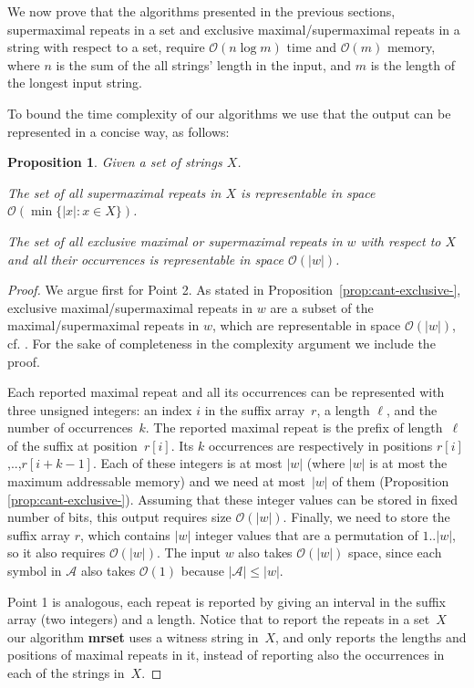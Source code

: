 \documentclass[submission]{dmtcs}
\newcommand{\Ode}{{\mathcal O}}
\newcommand\+[1]{\mathcal{#1}}
\newtheorem{proposition}[theorem]{Proposition}
\newenvironment{my_enumerate}{\begin{enumerate}
  \setlength{\itemsep}{1pt}
  \setlength{\parskip}{0pt}
  \setlength{\parsep}{0pt}}{\end{enumerate}}
\begin{document}
We now prove that the algorithms presented in the previous sections,
supermaximal repeats in a set and exclusive maximal/supermaximal repeats in a
string with respect to a set, require $\Ode(n \log m)$ time and $\Ode(m)$
memory, where $n$ is the sum of the all strings' length in the input, 
and $m$ is the length of the longest input string. 

To bound the time complexity of our algorithms
we use that the output can be represented in a concise way, as follows:

\begin{proposition}
Given a set of strings $X$.
\begin{my_enumerate}
\item The set of all supermaximal repeats in $X$ 
is representable in space $\Ode(\min\{|x|: x\in X\})$.

\item  The set of all exclusive maximal or supermaximal repeats in $w$ 
with respect to $X$  and all their occurrences
is representable in space $\Ode(|w|)$.
\end{my_enumerate}
\end{proposition}
\begin{proof}
We argue first for Point 2. 
As stated in Proposition~\ref{prop:cant-exclusive-}, 
exclusive maximal/supermaximal repeats in $w$ are a subset of the 
maximal/supermaximal repeats in $w$, which are representable
in space $\Ode(|w|)$, cf. \cite{findmaxr}.
For the sake of completeness in the complexity argument we include the 
proof.

Each reported maximal repeat and all its occurrences
can be represented with three unsigned integers:
an index $i$ in the suffix array~$r$,
a length $\ell$, and the number of occurrences~$k$.
The reported maximal repeat is the prefix of length~$\ell$
of the suffix at position~$r[i]$.
Its $k$ occurrences are respectively
in positions $r[i]$,..,$r[i+k-1]$.
Each of these integers is at most $|w|$
(where $|w|$ is at most the maximum addressable memory)
and we need at most~$|w|$ of them (Proposition \ref{prop:cant-exclusive-}).
Assuming that these integer values
can be stored in fixed number of bits,
this output requires size $\Ode(|w|)$.
Finally, we need to store the suffix array $r$,
which contains $|w|$ integer values that are
a permutation of $1..|w|$,
so it also requires $\Ode(|w|)$.
The input $w$ also takes $\Ode(|w|)$ space, since each symbol in $\+A$
also takes $\Ode(1)$ because $|\+A| \le |w|$.

Point 1 is analogous, each repeat is reported by giving an interval in the
suffix array (two integers) and a length.
Notice that to report the repeats in a set~$X$
our algorithm {\bf mrset} uses a witness string in~$X$,
and only reports the lengths and positions of maximal repeats in it,
instead of reporting also the occurrences in each of the strings in~$X$.
\end{proof}
\end{document}
